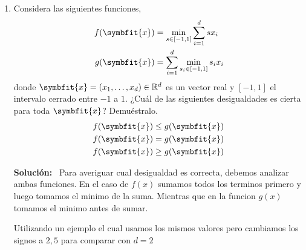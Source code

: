 \documentclass[11pt,letterpaper]{article}
\newenvironment{solution}{%
  \noindent\begin{shaded}
  \textbf{Solución:}\ }{
  \end{shaded}%
}
\newcommand{\bvec}[1]{\symbfit{#1}}
\begin{document}
\begin{enumerate}
\begin{solution}
Si obtenemos la segunda derivada podemos observar que es positivo el cual nos indica que efectivamente es un minimo.
  \end{solution}
\item%
  Considera las siguientes funciones,
  \[
  \begin{aligned}
    f(\bvec{x}) &= \min_{s\in[-1,1]}\sum_{i=1}^d sx_i \\
    g(\bvec{x}) &= \sum_{i=1}^d \min_{s_i\in[-1,1]} s_ix_i
  \end{aligned}
  \]
  donde \(\bvec{x} = (x_1,\dots,x_d)\in\mathbb{R}^d\) es un
  vector real y \([-1,1]\) el intervalo cerrado entre \(-1\) a
  \(1\). ¿Cuál de las siguientes desigualdades es cierta para toda
  \(\bvec{x}\)?  Demuéstralo.
  \[
  \begin{aligned}
    f(\bvec{x}) &\leq g(\bvec{x}) \\
    f(\bvec{x}) &= g(\bvec{x}) \\
    f(\bvec{x}) &\geq g(\bvec{x})
  \end{aligned}
  \]
  \begin{solution}
    Para averiguar cual desigualdad es correcta, debemos analizar ambas funciones. En el caso de \(f(x)\) sumamos todos los terminos primero y luego tomamos el minimo de la suma. Mientras que en la funcion \(g(x)\) tomamos el minimo antes de sumar.

Utilizando un ejemplo el cual usamos los mismos valores pero cambiamos los signos a \(2,5\) para comparar con \(d = 2\)


\end{solution}
\end{enumerate}
\end{document}
